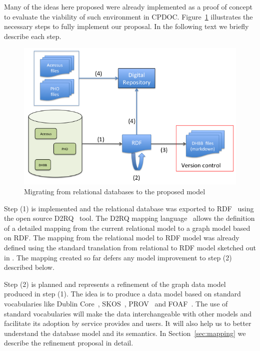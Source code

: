 
Many of the ideas here proposed were already implemented as a proof of
concept to evaluate the viability of such environment in
CPDOC. Figure~\ref{fig:dia-1} illustrates the necessary steps to fully
implement our proposal. In the following text we briefly describe each
step.

\begin{figure}[htbp]
  \centering
  \includegraphics[width=.7\textwidth]{migration.png}
  \caption{Migrating from relational databases to the proposed model}\label{fig:dia-1}
\end{figure}

Step (1) is implemented and the relational database was exported to
RDF~\cite{rdf-primer} using the open source D2RQ~\cite{d2rq} tool. The
D2RQ mapping language~\cite{d2rq-map} allows the definition of a
detailed mapping from the current relational model to a graph model
based on RDF. The mapping from the relational model to RDF model was
already defined using the standard translation from relational to RDF
model sketched out in \cite{dbANDrdf}. The mapping created so far
defers any model improvement to step (2) described below.


Step (2) is planned and represents a refinement of the graph data
model produced in step (1). The idea is to produce a data model based
on standard vocabularies like Dublin Core~\cite{dc}, SKOS~\cite{skos},
PROV~\cite{prov} and FOAF~\cite{foaf}. The use of standard
vocabularies will make the data interchangeable with other models and
facilitate its adoption by service provides and users. It will also
help us to better understand the database model and its semantics. In
Section~\ref{sec:mapping} we describe the refinement proposal in
detail.

